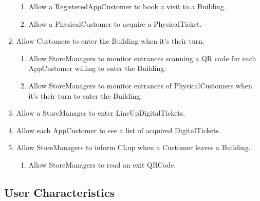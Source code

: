 \documentclass{article}
\begin{document}
\begin{enumerate}
\begin{enumerate}
			\item Allow a RegisteredAppCustomer to book a visit to a Building.
			\item Allow a PhysicalCustomer to acquire a PhysicalTicket.
		\end{enumerate}
		\renewcommand{\theenumi}{[G\,\arabic{enumi}]}
		\item Allow Customers to enter the Building when it’s their turn.
		\renewcommand{\labelenumii}{\theenumii}
		\renewcommand{\theenumi}{G\,\arabic{enumi}}
		\renewcommand{\theenumii}{[\theenumi.\arabic{enumii}].}
		\begin{enumerate}
			\item Allow StoreManagers to monitor entrances scanning a QR code for each AppCustomer willing to enter the Building.
			\item Allow StoreManagers to monitor entrances of PhysicalCustomers when it’s their turn to enter the Building.
		\end{enumerate}
		\renewcommand{\theenumi}{[G\,\arabic{enumi}]}
		\item Allow a StoreManager to enter LineUpDigitalTickets.
		\item Allow each AppCustomer to see a list of acquired DigitalTickets.
		\item Allow StoreManagers to inform CLup when a Customer leaves a Building.
		\renewcommand{\labelenumii}{\theenumii}
		\renewcommand{\theenumi}{G\,\arabic{enumi}}
		\renewcommand{\theenumii}{[\theenumi.\arabic{enumii}].}
		\begin{enumerate}
			\item Allow StoreManagers to read an exit QRCode.
		\end{enumerate}
	 \end{enumerate}
	
	\subsection{User Characteristics}
	
\end{document}
